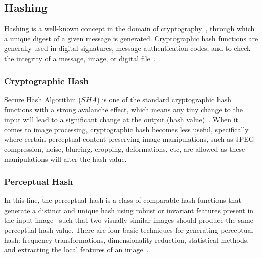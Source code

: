 \documentclass[acmsmall, nonacm]{acmart}
\begin{document}

\subsection{Hashing}\label{subsec:hashing}

Hashing is a well-known concept in the domain of cryptography~\cite{lin1998generating}, through which a unique digest of a given message is generated. Cryptographic hash functions are generally used in digital signatures, message authentication codes, and to check the integrity of a message, image, or digital file~\cite{crypto}.

\subsubsection{Cryptographic Hash}\label{subsubsec:cryptographic-hash}

Secure Hash Algorithm ($SHA$) is one of the standard cryptographic hash functions with a strong avalanche effect, which means any tiny change to the input will lead to a significant change at the output (hash value)~\cite{chen2022asymmetric,crypto,lin1998generating}. When it comes to image processing, cryptographic hash becomes less useful, specifically where certain perceptual content-preserving image manipulations, such as JPEG compression, noise, blurring, cropping, deformations, etc, are allowed as these manipulations will alter the hash value.

\subsubsection{Perceptual Hash}\label{subsubsec:perceptual-hash}

In this line, the perceptual hash is a class of comparable hash functions that generate a distinct and unique hash using robust or invariant features present in the input image~\cite{phash2, thesis,phash1,phashcopy2,ref8,qamra2005enhanced} such that two visually similar images should produce the same perceptual hash value. There are four basic techniques for generating perceptual hash: frequency transformations, dimensionality reduction, statistical methods,  and extracting the local features of an image~\cite{ref10}.
\end{document}
